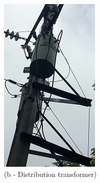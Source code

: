 \begin{figure}
\begin{minipage}[b]{0.22\linewidth}
		\includegraphics[width=\textwidth]{figures/asv_visual_bldg_distribution_transformer}
		\caption*{(b - Distribution transformer)}


\end{minipage}
\end{figure}
